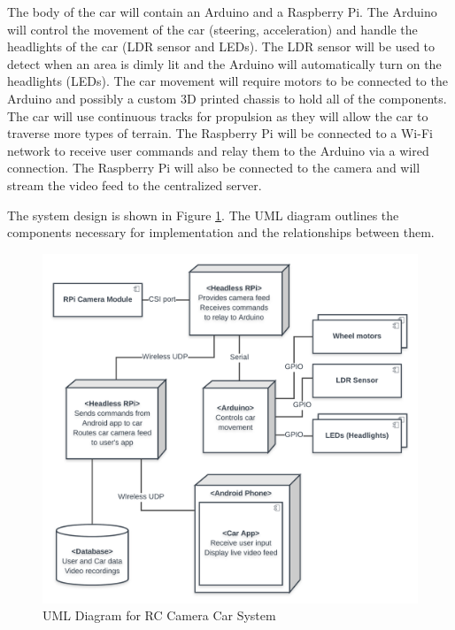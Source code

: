 \documentclass[letterpaper,12pt]{report}
\begin{document}
	The body of the car will contain an Arduino and a Raspberry Pi. The Arduino
	will control the movement of the car (steering, acceleration) and handle
	the headlights of the car (LDR sensor and LEDs). The LDR sensor will be
	used to detect when an area is dimly lit and the Arduino will automatically
	turn on the headlights (LEDs). The car movement will require motors to be
	connected to the Arduino and possibly a custom 3D printed chassis to hold
	all of the components. The car will use continuous tracks for propulsion as
	they will allow the car to traverse more types of terrain. The Raspberry Pi
	will be connected to a Wi-Fi network to receive user commands and relay
	them to the Arduino via a wired connection. The Raspberry Pi will also be
	connected to the camera and will stream the video feed to the centralized
	server.

	The system design is shown in Figure \ref{fig:uml}. The UML diagram outlines the
	components necessary for implementation and the relationships between them.

	\begin{figure}[h]
    	\centering
		\includegraphics[width=\linewidth]{Proposal_UML_Diagram.png}
    	\caption{UML Diagram for RC Camera Car System}
    	\label{fig:uml}
	\end{figure}
\end{document}

